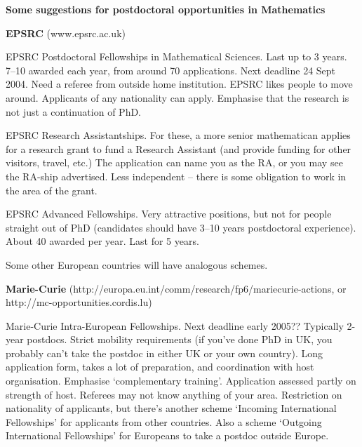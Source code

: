 \documentclass[a4,12pt]{article}
\begin{document}
{\bf Some suggestions for postdoctoral opportunities in Mathematics}

\smallskip

{\bf EPSRC} (www.epsrc.ac.uk)

\smallskip

 EPSRC Postdoctoral Fellowships in Mathematical Sciences. Last up to 3 years. 7--10
 awarded each year, from around 70 applications. 
Next deadline  24 Sept 2004. Need a referee from outside home institution. 
EPSRC likes people to move around. Applicants of any nationality can apply. Emphasise 
that the research is not just a continuation of PhD.

\smallskip

EPSRC Research Assistantships. For these, a more senior mathematican applies for a research grant
to fund a Research Assistant (and provide funding for other visitors, travel, etc.)
 The application can name you
as the RA, or you may see the RA-ship advertised. Less independent -- there is some 
obligation to work in the area of the grant.

\smallskip

EPSRC Advanced Fellowships. Very attractive positions, but not for people straight out of PhD
(candidates should have 3--10 years postdoctoral experience). About 40 awarded per year.
 Last for 5 years.

\smallskip

Some other European countries will have analogous schemes.

\medskip


{\bf Marie-Curie} (http://europa.eu.int/comm/research/fp6/mariecurie-actions, or
http://mc-opportunities.cordis.lu)

\smallskip

Marie-Curie Intra-European Fellowships. Next deadline early 2005?? Typically 2-year postdocs.
Strict mobility requirements (if you've done PhD in UK, you probably can't take the postdoc in
either UK or your own country). Long application form, takes a lot of preparation, and coordination 
with host organisation. Emphasise `complementary training'. Application assessed partly on 
strength of host. 
Referees may not know anything of your area. Restriction on nationality of applicants, but there's 
another scheme `Incoming International Fellowships' for applicants from other countries. Also a scheme
`Outgoing International Fellowships' for Europeans to take a postdoc outside Europe. 


\smallskip
\end{document}
